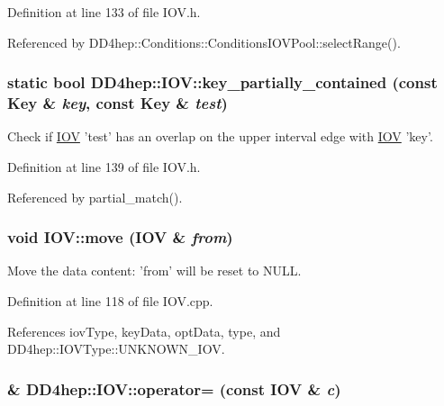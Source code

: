 Definition at line 133 of file IOV.h.

Referenced by DD4hep::Conditions::ConditionsIOVPool::selectRange().\hypertarget{class_d_d4hep_1_1_i_o_v_ae2d6950a52f1d51409a19b76385252df}{
\subsubsection[{key\_\-partially\_\-contained}]{\setlength{\rightskip}{0pt plus 5cm}static bool DD4hep::IOV::key\_\-partially\_\-contained (const {\bf Key} \& {\em key}, \/  const {\bf Key} \& {\em test})}}
\label{class_d_d4hep_1_1_i_o_v_ae2d6950a52f1d51409a19b76385252df}


Check if \hyperlink{class_d_d4hep_1_1_i_o_v}{IOV} 'test' has an overlap on the upper interval edge with \hyperlink{class_d_d4hep_1_1_i_o_v}{IOV} 'key'. 

Definition at line 139 of file IOV.h.

Referenced by partial\_\-match().\hypertarget{class_d_d4hep_1_1_i_o_v_aa473ed270d7b0e3930b2654406233a3c}{
\subsubsection[{move}]{\setlength{\rightskip}{0pt plus 5cm}void IOV::move ({\bf IOV} \& {\em from})}}
\label{class_d_d4hep_1_1_i_o_v_aa473ed270d7b0e3930b2654406233a3c}


Move the data content: 'from' will be reset to NULL. 

Definition at line 118 of file IOV.cpp.

References iovType, keyData, optData, type, and DD4hep::IOVType::UNKNOWN\_\-IOV.\hypertarget{class_d_d4hep_1_1_i_o_v_a3e52be5e863dcb3e84549dd309da9878}{
\subsubsection[{operator=}]{\& DD4hep::IOV::operator= (const {\bf IOV} \& {\em c})}}
\label{class_d_d4hep_1_1_i_o_v_a3e52be5e863dcb3e84549dd309da9878}


